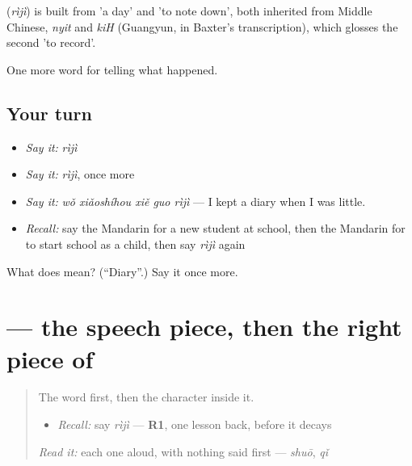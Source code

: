 \begin{cousinweb}
\textbf{} (\emph{rìjì}) is built from  'a day' and  'to note down', both inherited from Middle Chinese, \emph{nyit} and \emph{kiH} (Guangyun, in Baxter's transcription), which glosses the second 'to record'.
\end{cousinweb}

\begin{grammarlens}[title={What you've built}]
One more word for telling what happened.
\end{grammarlens}

\subsection*{Your turn}
\begin{itemize}
\raggedright
  \item \emph{Say it:} \emph{rìjì}
  \item \emph{Say it:} \emph{rìjì}, once more
  \item \emph{Say it:} \emph{wǒ xiǎoshíhou xiě guo rìjì} — I kept a diary when I was little.
  \item \emph{Recall:} say the Mandarin for a new student at school, then the Mandarin for to start school as a child, then say \emph{rìjì} again
\end{itemize}

\begin{tcolorbox}[breakable,colback=teal!4,colframe=teal!35!black,title={Before you move on}]
What does  mean? (\textquotedblleft{}Diary\textquotedblright{}.) Say it once more.
\end{tcolorbox}
\section[\texorpdfstring{\zh{记} (jì)}{记 (jì)}]{ — the speech piece, then the right piece of }

\label{lesson:ZH-W304-ji-note}



\begin{quote}
The word first, then the character inside it.

\begin{itemize}
\raggedright
  \item \emph{Recall:} say \emph{rìjì} — \textbf{R1}, one lesson back, before it decays
\end{itemize}

\begin{quote}
 
\end{quote}

\emph{Read it:} each one aloud, with nothing said first — \emph{shuō}, \emph{qǐ}
\end{quote}

